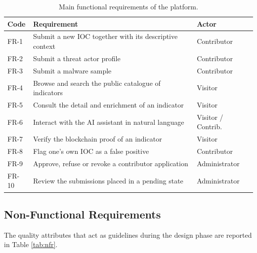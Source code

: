 \documentclass[12pt,a4paper,oneside]{book}
\begin{document}
{{\begin{table}[!h]
\caption{Main functional requirements of the platform.}
\label{tab:fr}
\centering
\renewcommand{\arraystretch}{1.35}
\begin{tabular}{| C{.08\textwidth} | p{.65\textwidth} | C{.17\textwidth} |}
\hline
\textbf{Code} & \textbf{Requirement} & \textbf{Actor} \\
\hline\hline
FR-1  & \nohyphens{Submit a new IOC together with its descriptive context} & Contributor \\
\hline
FR-2  & \nohyphens{Submit a threat actor profile} & Contributor \\
\hline
FR-3  & \nohyphens{Submit a malware sample} & Contributor \\
\hline
FR-4  & \nohyphens{Browse and search the public catalogue of indicators} & Visitor \\
\hline
FR-5  & \nohyphens{Consult the detail and enrichment of an indicator} & Visitor \\
\hline
FR-6  & \nohyphens{Interact with the AI assistant in natural language} & Visitor / Contrib. \\
\hline
FR-7  & \nohyphens{Verify the blockchain proof of an indicator} & Visitor \\
\hline
FR-8  & \nohyphens{Flag one's own IOC as a false positive} & Contributor \\
\hline
FR-9  & \nohyphens{Approve, refuse or revoke a contributor application} & Administrator \\
\hline
FR-10 & \nohyphens{Review the submissions placed in a pending state} & Administrator \\
\hline
\end{tabular}
\end{table}

\subsection{Non-Functional Requirements}

The quality attributes that act as guidelines during the design phase are
reported in Table \ref{tab:nfr}.

}}
\end{document}
